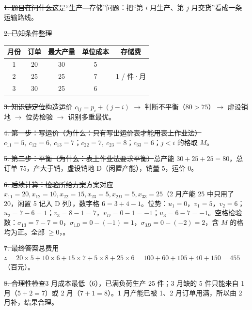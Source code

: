 \st{1. 题目在问什么}这是“生产—存储”问题：把“第 $i$ 月生产、第 $j$ 月交货”看成一条运输路线。\par
\st{2. 已知条件整理}
\begin{center}\small
\begin{tabular}{@{}ccccc@{}}
\toprule
月份 & 订单 & 最大产量 & 单位成本 & 存储费\\
\midrule
1 & 20 & 30 & 5 & \multirow{3}{*}{1 / 件·月}\\
2 & 25 & 25 & 7 & \\
3 & 30 & 25 & 6 & \\
\bottomrule
\end{tabular}
\end{center}
\st{3. 知识链定位}构造运价 $c_{ij}=p_i+(j-i)$ $\to$ 判断不平衡（$80>75$）$\to$ 虚设销地 $\to$ 位势检验 $\to$ 识别多重最优。\par
\st{4. 第一步：写运价（为什么：只有写出运价表才能用表上作业法）}$c_{11}=5,\ c_{12}=6,\ c_{13}=7$；$c_{22}=7,\ c_{23}=8$；$c_{33}=6$；$j<i$ 的格取 $M$。\par
\st{5. 第二步：平衡（为什么：表上作业法要求平衡）}总产能 $30+25+25=80$，总订单 75，产大于销，虚设销地 D（闲置产能），销量 5，运价 0。
\begin{center}\end{center}
\st{6. 后续计算：检验所给方案}方案对应 $x_{11}=20,x_{12}=10,x_{22}=15,x_{23}=5,x_{2D}=5,x_{33}=25$（2 月产能 25 中只用了 20，闲置 5 记入 D 列），数字格 $6=3+4-1$。位势：$u_1=0$，$v_1=5$，$v_2=6$；$u_2=7-6=1$；$v_3=8-1=7$，$v_D=0-1=-1$；$u_3=6-7=-1$。空格检验数：$\sigma_{13}=7-7=0$，$\sigma_{1D}=0-(-1)=1$，$\sigma_{3D}=0-(-2)=2$，含 $M$ 的格均为正。全部 $\ge0$，。\par
\st{7. 最终答案}总费用 $z=20\times5+10\times6+15\times7+5\times8+25\times6=100+60+105+40+150=455$（百元）。\par
\st{8. 合理性检查}3 月成本最低（6），已满负荷生产 25 件；3 月缺的 5 件只能来自 1 月（$5+2=7$）或 2 月（$7+1=8$）。1 月产能已被 1、2 月订单用满，所以由 2 月补，结果合理。\par
